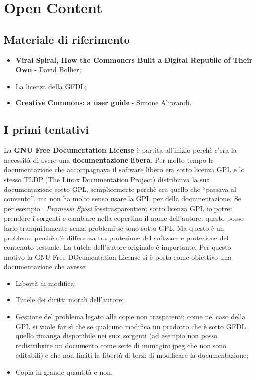 \section{Open Content}

\subsection*{Materiale di riferimento}

\begin{itemize}

\item \textbf{Viral Spiral, How the Commoners Built a Digital Republic of Their Own} - David Bollier;
\item La licenza della GFDL;
\item \textbf{Creative Commons: a user guide} - Simone Aliprandi.

\end{itemize}

\subsection{I primi tentativi}

La \textbf{GNU Free Documentation License} è partita all'inizio perchè c'era la necessità di avere una \textbf{documentazione libera}. Per molto tempo la documentazione che accompagnava il software libero era sotto licenza GPL e lo stesso TLDP (The Linux Documentation Project) distribuiva la sua documentazione sotto GPL, semplicemente perchè era quello che ``passava al convento'', ma non ha molto senso usare la GPL per della documentazione. Se per esempio i \textit{Promessi Sposi} fosstrasparentiero sotto licenza GPL io potrei prendere i sorgenti e cambiare nella copertina il nome dell'autore: questo posso farlo tranquillamente senza problemi se sono sotto GPL. Ma questo è un problema perchè c'è differenza tra protezione del software e protezione del contenuto testuale. La tutela dell'autore originale è importante. Per questo motivo la GNU Free DOcumentation License si è posta come obiettivo una documentazione che avesse:

\begin{itemize}

\item Libertà di modifica;
\item Tutele dei diritti morali dell'autore;
\item Gestione del problema legato alle copie non trasparenti; come nel caso della GPL si vuole far sì che se qualcuno modifica un prodotto che è sotto GFDL quello rimanga disponibile nei suoi sorgenti (ad esempio non posso redistribuire un documento come serie di immagini jpeg che non sono editabili) e che non limiti la libertà di terzi di modificare la documentazione;
\item Copia in grande quantità e non.

\end{itemize}

